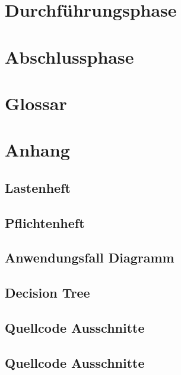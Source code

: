 \documentclass[11pt]{article}
\begin{document}
\section{Durchführungsphase}
\label{sec:Durchführungsphase}


\section{Abschlussphase}
\label{sec:Abschlussphase}


\pagebreak

\section{Glossar}
\printnoidxglossary[title={Glossar}, type=main]

\section{Anhang}


\pagebreak




\pagebreak

\pagebreak


\subsection{Lastenheft}

\subsection{Pflichtenheft}
%

\subsection{Anwendungsfall Diagramm}
%

\subsection{Decision Tree}
%

\subsection{Quellcode Ausschnitte}
%

\subsection{Quellcode Ausschnitte}
%
\end{document}
